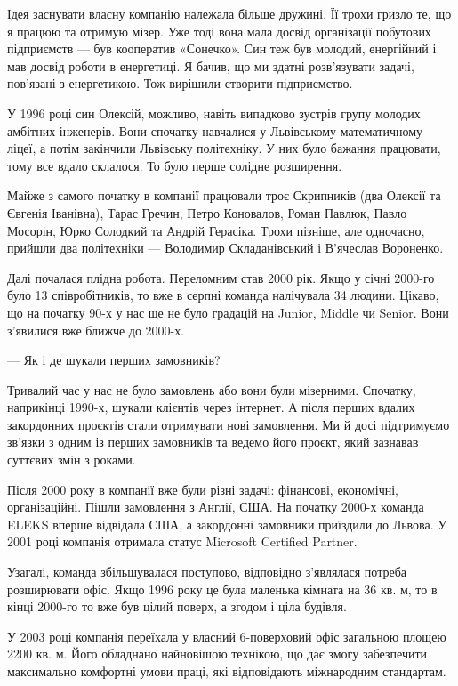 Ідея заснувати власну компанію належала більше дружині. Її трохи гризло те, що
я працюю та отримую мізер. Уже тоді вона мала досвід організації побутових
підприємств — був кооператив «Сонечко». Син теж був молодий, енергійний і мав
досвід роботи в енергетиці. Я бачив, що ми здатні розв’язувати задачі,
пов’язані з енергетикою. Тож вирішили створити підприємство.

У 1996 році син Олексій, можливо, навіть випадково зустрів групу молодих
амбітних інженерів. Вони спочатку навчалися у Львівському математичному ліцеї,
а потім закінчили Львівську політехніку. У них було бажання працювати, тому все
вдало склалося. То було перше солідне розширення.

Майже з самого початку в компанії працювали троє Скрипників (два Олексії та
Євгенія Іванівна), Тарас Гречин, Петро Коновалов, Роман Павлюк, Павло Мосорін,
Юрко Солодкий та Андрій Герасіка. Трохи пізніше, але одночасно, прийшли два
політехніки — Володимир Складанівський і В’ячеслав Вороненко.

Далі почалася плідна робота. Переломним став 2000 рік. Якщо у січні 2000-го
було 13 співробітників, то вже в серпні команда налічувала 34 людини. Цікаво,
що на початку 90-х у нас ще не було градацій на Junior, Middle чи Senior. Вони
з’явилися вже ближче до 2000-х.


— Як і де шукали перших замовників?

Тривалий час у нас не було замовлень або вони були мізерними. Спочатку,
наприкінці 1990-х, шукали клієнтів через інтернет. А після перших вдалих
закордонних проєктів стали отримувати нові замовлення. Ми й досі підтримуємо
зв’язки з одним із перших замовників та ведемо його проєкт, який зазнавав
суттєвих змін з роками.

Після 2000 року в компанії вже були різні задачі: фінансові, економічні,
організаційні. Пішли замовлення з Англії, США. На початку 2000-х команда ELEKS
вперше відвідала США, а закордонні замовники приїздили до Львова. У 2001 році
компанія отримала статус Microsoft Certified Partner.

Узагалі, команда збільшувалася поступово, відповідно з’являлася потреба
розширювати офіс. Якщо 1996 року це була маленька кімната на 36 кв. м, то в
кінці 2000-го то вже був цілий поверх, а згодом і ціла будівля.

У 2003 році компанія переїхала у власний 6-поверховий офіс загальною площею
2200 кв. м. Його обладнано найновішою технікою, що дає змогу забезпечити
максимально комфортні умови праці, які відповідають міжнародним стандартам.

